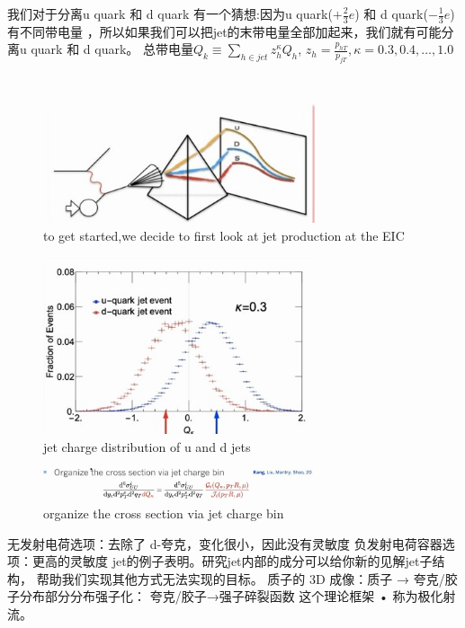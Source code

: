 \documentclass[12pt, a4paper, oneside]{ctexart}
\begin{document}
\begin{spacing}{2.0}
我们对于分离u quark 和 d quark 有一个猜想:因为u quark($+\frac{2}{3}e$) 和 d quark($-\frac{1}{3}e$) 有不同带电量
，所以如果我们可以把jet的末带电量全部加起来，我们就有可能分离u quark 和 d quark。
总带电量$Q_k \equiv \sum_{h\in jet}z^{\kappa}_hQ_h$, $z_h = \frac{p_{hT}}{p_{jT}},\kappa = 0.3,0.4,\dots,1.0$
\begin{figure}
    \centering
    \includegraphics[width=8cm]{gamma.jpg}
    \caption{to get started,we decide to first look at jet production at the EIC}    
\end{figure}
\begin{figure}
    \centering
    \includegraphics[width=8cm]{xi.jpg}
    \caption{jet charge distribution of u and d jets}    
\end{figure}
\begin{figure}
    \centering
    \includegraphics[width=8cm]{omega.jpg}
    \caption{organize the cross section via jet charge bin}    
\end{figure}
无发射电荷选项：去除了 d-夸克，变化很小，因此没有灵敏度
负发射电荷容器选项：更高的灵敏度
jet的例子表明。研究jet内部的成分可以给你新的见解jet子结构，
帮助我们实现其他方式无法实现的目标。
质子的 3D 成像：质子 → 夸克/胶子分布部分分布强子化：
夸克/胶子→强子碎裂函数
这个理论框架 • 称为极化射流。




\end{spacing}
\end{document}
